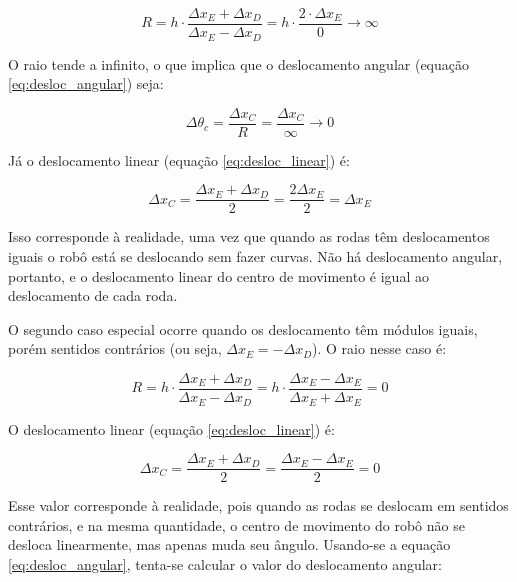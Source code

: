 \begin{equation}
  R = h \cdot \frac{\Delta x_E + \Delta x_D} {\Delta x_E - \Delta x_D} = h \cdot \frac{2 \cdot \Delta x_E}{0} \rightarrow \infty
  \label{eq:caso_especial1_R}
\end{equation}


O raio tende a infinito, o que implica que o deslocamento angular (equação \ref{eq:desloc_angular}) seja:

\begin{equation}
  \Delta \theta_c = \frac{\Delta x_C}{R} = \frac{\Delta x_C}{\infty} \rightarrow 0
  \label{eq:caso_especial1_theta}
\end{equation}

Já o deslocamento linear (equação \ref{eq:desloc_linear}) é:

\begin{equation}
  \Delta x_C = \frac{\Delta x_E + \Delta x_D}{2} = \frac{2 \Delta x_E}{2} = \Delta x_E
  \label{eq:caso_especial1_x}
\end{equation}

Isso corresponde à realidade, uma vez que quando as rodas têm deslocamentos iguais o robô está se deslocando sem fazer curvas. Não há deslocamento angular, portanto, e o deslocamento linear do centro de movimento é igual ao deslocamento de cada roda.

O segundo caso especial ocorre quando os deslocamento têm módulos iguais, porém sentidos contrários (ou seja, $\Delta x_E = - \Delta x_D$). O raio nesse caso é:

\begin{equation}
  R = h \cdot \frac{\Delta x_E + \Delta x_D} {\Delta x_E - \Delta x_D} = h \cdot \frac{\Delta x_E - \Delta x_E}{\Delta x_E + \Delta x_E} = 0
    \label{eq:caso_especial2_R}
\end{equation}


O deslocamento linear (equação \ref{eq:desloc_linear}) é:

\begin{equation}
  \Delta x_C = \frac{\Delta x_E + \Delta x_D}{2} = \frac{\Delta x_E - \Delta x_E}{2} = 0
  \label{eq:caso_especial2_x}
\end{equation}

Esse valor corresponde à realidade, pois quando as rodas se deslocam em sentidos contrários, e na mesma quantidade, o centro de movimento do robô não se desloca linearmente, mas apenas muda seu ângulo.
Usando-se a equação \ref{eq:desloc_angular}, tenta-se calcular o valor do deslocamento angular:

